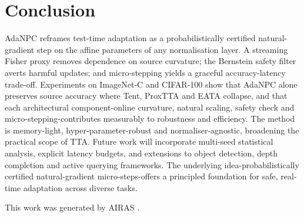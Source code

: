 \documentclass{article} %
\begin{document}
\section{Conclusion}
\label{sec:conclusion}
AdaNPC reframes test-time adaptation as a probabilistically certified natural-gradient step on the affine parameters of any normalisation layer. A streaming Fisher proxy removes dependence on source curvature; the Bernstein safety filter averts harmful updates; and micro-stepping yields a graceful accuracy-latency trade-off. Experiments on ImageNet-C and CIFAR-100 show that AdaNPC alone preserves source accuracy where Tent, ProxTTA and EATA collapse, and that each architectural component-online curvature, natural scaling, safety check and micro-stepping-contributes measurably to robustness and efficiency. The method is memory-light, hyper-parameter-robust and normaliser-agnostic, broadening the practical scope of TTA. Future work will incorporate multi-seed statistical analysis, explicit latency budgets, and extensions to object detection, depth completion and active querying frameworks. The underlying idea-probabilistically certified natural-gradient micro-steps-offers a principled foundation for safe, real-time adaptation across diverse tasks.

This work was generated by \textsc{AIRAS} \citep{airas2025}.



\end{document}
